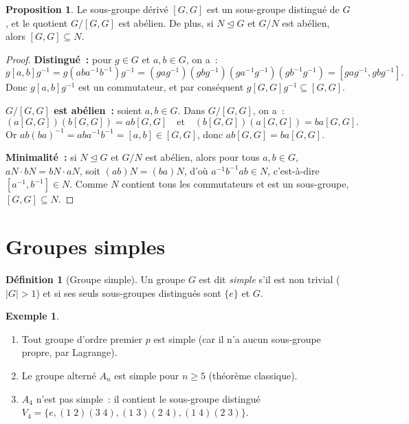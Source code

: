 \documentclass[12pt,a4paper,openany]{book}
\theoremstyle{definition}
\newtheorem{definition}{Définition}[chapter]
\newtheorem{proposition}{Proposition}[chapter]
\newtheorem{exemple}{Exemple}[chapter]
\newcommand{\normal}{\trianglelefteq}
\newcommand{\abs}[1]{\lvert #1 \rvert}
\begin{document}
\begin{proposition}
\label{prop:derive-distingue}
Le sous-groupe dérivé $[G, G]$ est un sous-groupe distingué de $G$, et le quotient
$G/[G,G]$ est abélien. De plus, si $N \normal G$ et $G/N$ est abélien, alors $[G,G]
\subseteq N$.
\end{proposition}

\begin{proof}
\textbf{Distingué~:} pour $g \in G$ et $a, b \in G$, on a~:
\[
  g[a,b]g^{-1} = g(aba^{-1}b^{-1})g^{-1} = (gag^{-1})(gbg^{-1})(ga^{-1}g^{-1})
  (gb^{-1}g^{-1}) = [gag^{-1}, gbg^{-1}].
\]
Donc $g[a,b]g^{-1}$ est un commutateur, et par conséquent $g[G,G]g^{-1} \subseteq [G,G]$.

\textbf{$G/[G,G]$ est abélien~:} soient $a, b \in G$. Dans $G/[G,G]$, on a~:
\[
  (a[G,G])(b[G,G]) = ab[G,G] \quad \text{et} \quad (b[G,G])(a[G,G]) = ba[G,G].
\]
Or $ab(ba)^{-1} = aba^{-1}b^{-1} = [a,b] \in [G,G]$, donc $ab[G,G] = ba[G,G]$.

\textbf{Minimalité~:} si $N \normal G$ et $G/N$ est abélien, alors pour tous $a, b \in
G$, $aN \cdot bN = bN \cdot aN$, soit $(ab)N = (ba)N$, d'où $a^{-1}b^{-1}ab \in N$,
c'est-à-dire $[a^{-1}, b^{-1}] \in N$. Comme $N$ contient tous les commutateurs et est
un sous-groupe, $[G,G] \subseteq N$.
\end{proof}

\section{Groupes simples}
\label{sec:ch2-simples}

\begin{definition}[Groupe simple]
\label{def:simple}
Un groupe $G$ est dit \emph{simple} s'il est non trivial ($\abs{G} > 1$) et si ses seuls
sous-groupes distingués sont $\{e\}$ et $G$.
\end{definition}

\begin{exemple}
\label{ex:simples}
\begin{enumerate}[label=(\roman*)]
  \item Tout groupe d'ordre premier $p$ est simple (car il n'a aucun sous-groupe propre,
    par Lagrange).
  \item Le groupe alterné $A_n$ est simple pour $n \geq 5$ (théorème classique).
  \item $A_4$ n'est pas simple~: il contient le sous-groupe distingué $V_4 = \{e,
    (1\;2)(3\;4), (1\;3)(2\;4), (1\;4)(2\;3)\}$.
\end{enumerate}
\end{exemple}
\end{document}
